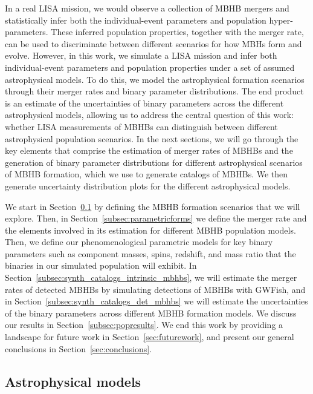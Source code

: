 \documentclass[a4paper,12pt]{article}
\begin{document}
In a real LISA mission, we would observe a collection of MBHB mergers and statistically infer both the individual-event parameters and population hyper-parameters. These inferred population properties, together with the merger rate, can be used to discriminate between different scenarios for how MBHs form and evolve. However, in this work, we simulate a LISA mission and infer both individual-event parameters and population properties under a set of assumed astrophysical models. To do this, we model the astrophysical formation scenarios through their merger rates and binary parameter distributions. The end product is an estimate of the uncertainties of binary parameters across the different astrophysical models, allowing us to address the central question of this work: whether LISA measurements of MBHBs can distinguish between different astrophysical population scenarios. In the next sections, we will go through the key elements that comprise the estimation of merger rates of MBHBs and the generation of binary parameter distributions for different astrophysical scenarios of MBHB formation, which we use to generate catalogs of MBHBs. We then generate uncertainty distribution plots for the different astrophysical models. 

We start in Section~\ref{subsec:astro_models} by defining the MBHB formation scenarios that we will explore. Then, in Section~\ref{subsec:parametricforms} we define the merger rate and the elements involved in its estimation for different MBHB population models. Then, we define our phenomenological parametric models for key binary parameters such as component masses, spins, redshift, and mass ratio that the binaries in our simulated population will exhibit. In Section~\ref{subsec:synth_catalogs_intrinsic_mbhbs}, we will estimate the merger rates of detected MBHBs by simulating detections of MBHBs with GWFish, and in Section~\ref{subsec:synth_catalogs_det_mbhbs} we will estimate the uncertainties of the binary parameters across different MBHB formation models. We discuss our results in Section~\ref{subsec:popresults}. We end this work by providing a landscape for future work in Section~\ref{sec:futurework}, and present our general conclusions in Section~\ref{sec:conclusions}.

\FloatBarrier
\subsection{Astrophysical models}
\label{subsec:astro_models}
\end{document}
